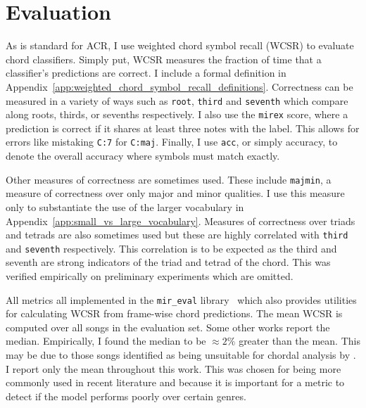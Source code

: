 


\section{Evaluation}\label{sec:evaluation}

As is standard for ACR, I use weighted chord symbol recall (WCSR) to evaluate chord classifiers. Simply put, WCSR measures the fraction of time that a classifier's predictions are correct. I include a formal definition in Appendix~\ref{app:weighted_chord_symbol_recall_definitions}. Correctness can be measured in a variety of ways such as \texttt{root}, \texttt{third} and \texttt{seventh} which compare along roots, thirds, or sevenths respectively. I also use the \texttt{mirex} score, where a prediction is correct if it shares at least three notes with the label. This allows for errors like mistaking \texttt{C:7} for \texttt{C:maj}. Finally, I use \texttt{acc}, or simply accuracy, to denote the overall accuracy where symbols must match exactly.

Other measures of correctness are sometimes used. These include \texttt{majmin}, a measure of correctness over only major and minor qualities. I use this measure only to substantiate the use of the larger vocabulary in Appendix~\ref{app:small_vs_large_vocabulary}. Measures of correctness over triads and tetrads are also sometimes used but these are highly correlated with \texttt{third} and \texttt{seventh} respectively. This correlation is to be expected as the third and seventh are strong indicators of the triad and tetrad of the chord. This was verified empirically on preliminary experiments which are omitted.

All metrics all implemented in the \texttt{mir\_eval} library~\citep{mir_eval} which also provides utilities for calculating WCSR from frame-wise chord predictions. The mean WCSR is computed over all songs in the evaluation set. Some other works report the median. Empirically, I found the median to be $\approx 2\%$ greater than the mean. This may be due to those songs identified as being unsuitable for chordal analysis by \citet{FourTimelyInsights}. I report only the mean throughout this work. This was chosen for being more commonly used in recent literature and because it is important for a metric to detect if the model performs poorly over certain genres.

